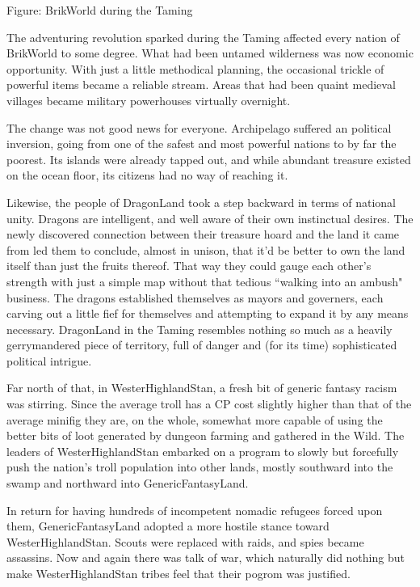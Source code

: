 \documentclass[12pt,a4paper,twocolumn]{article}
\begin{document}
Figure: BrikWorld during the Taming

The adventuring revolution sparked during the Taming affected every nation of BrikWorld to some degree.  What had been untamed wilderness was now economic opportunity.  With just a little methodical planning, the occasional trickle of powerful items became a reliable stream.  Areas that had been quaint medieval villages became military powerhouses virtually overnight.

The change was not good news for everyone.  Archipelago suffered an political inversion, going from one of the safest and most powerful nations to by far the poorest.  Its islands were already tapped out, and while abundant treasure existed on the ocean floor, its citizens had no way of reaching it.

Likewise, the people of DragonLand took a step backward in terms of national unity.  Dragons are intelligent, and well aware of their own instinctual desires.  The newly discovered connection between their treasure hoard and the land it came from led them to conclude, almost in unison, that it'd be better to own the land itself than just the fruits thereof.  That way they could gauge each other's strength with just a simple map without that tedious ``walking into an ambush" business.  The dragons established themselves as mayors and governers, each carving out a little fief for themselves and attempting to expand it by any means necessary.  DragonLand in the Taming resembles nothing so much as a heavily gerrymandered piece of territory, full of danger and (for its time) sophisticated political intrigue.

Far north of that, in WesterHighlandStan, a fresh bit of generic fantasy racism was stirring.  Since the average troll has a CP cost slightly higher than that of the average minifig they are, on the whole, somewhat more capable of using the better bits of loot generated by dungeon farming and gathered in the Wild.  The leaders of WesterHighlandStan embarked on a program to slowly but forcefully push the nation's troll population into other lands, mostly southward into the swamp and northward into GenericFantasyLand.

In return for having hundreds of incompetent nomadic refugees forced upon them, GenericFantasyLand adopted a more hostile stance toward WesterHighlandStan.  Scouts were replaced with raids, and spies became assassins.  Now and again there was talk of war, which naturally did nothing but make WesterHighlandStan tribes feel that their pogrom was justified.
\end{document}
